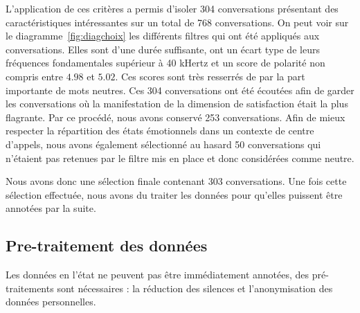 

L'application de ces critères a permis d'isoler 304 conversations présentant des caractéristiques intéressantes sur un total de 768 conversations. On peut voir sur le diagramme~\ref{fig:diagchoix} les différents filtres qui ont été appliqués aux conversations. Elles sont d'une durée suffisante, ont un écart type de leurs fréquences fondamentales supérieur à 40 kHertz et un score de polarité non compris entre $4.98$ et $5.02$. Ces scores sont très resserrés de par la part importante de mots neutres. Ces 304 conversations ont été écoutées afin de garder les conversations où la manifestation de la dimension de satisfaction était la plus flagrante. Par ce procédé, nous avons conservé 253 conversations.
Afin de mieux respecter la répartition des états émotionnels dans un contexte de centre d'appels, nous avons également sélectionné au hasard 50 conversations qui n'étaient pas retenues par le filtre mis en place et donc considérées comme neutre.

Nous avons donc une sélection finale contenant 303 conversations.
Une fois cette sélection effectuée, nous avons du traiter les données pour qu'elles puissent être annotées par la suite.

\subsection{Pre-traitement des données}
Les données en l'état ne peuvent pas être immédiatement annotées, des pré-traitements sont nécessaires : la réduction des silences et l'anonymisation des données personnelles.

